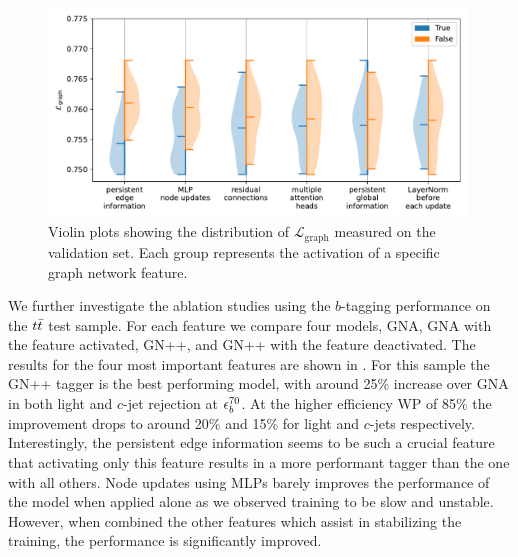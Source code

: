 \begin{figure}[ht]
    \centering
    \includegraphics[width=0.99\textwidth]{figures/flavour_tagging/violin.pdf}
    \caption{Violin plots showing the distribution of $\mathcal{L}_{\text{graph}}$ measured on the validation set. Each group represents the activation of a specific graph network feature.}
    \label{fig:violin}
\end{figure}

We further investigate the ablation studies using the $b$-tagging performance on the $t\bar{t}$ test sample.
For each feature we compare four models, GNA, GNA with the feature activated, GN++, and GN++ with the feature deactivated.
The results for the four most important features are shown in .
For this sample the GN++ tagger is the best performing model, with around 25\% increase over GNA in both light and $c$-jet rejection at $\epsilon_b^{70}$.
At the higher efficiency WP of 85\% the improvement drops to around 20\% and 15\% for light and $c$-jets respectively.
Interestingly, the persistent edge information seems to be such a crucial feature that activating only this feature results in a more performant tagger than the one with all others.
Node updates using MLPs barely improves the performance of the model when applied alone as we observed training to be slow and unstable.
However, when combined the other features which assist in stabilizing the training, the performance is significantly improved.

